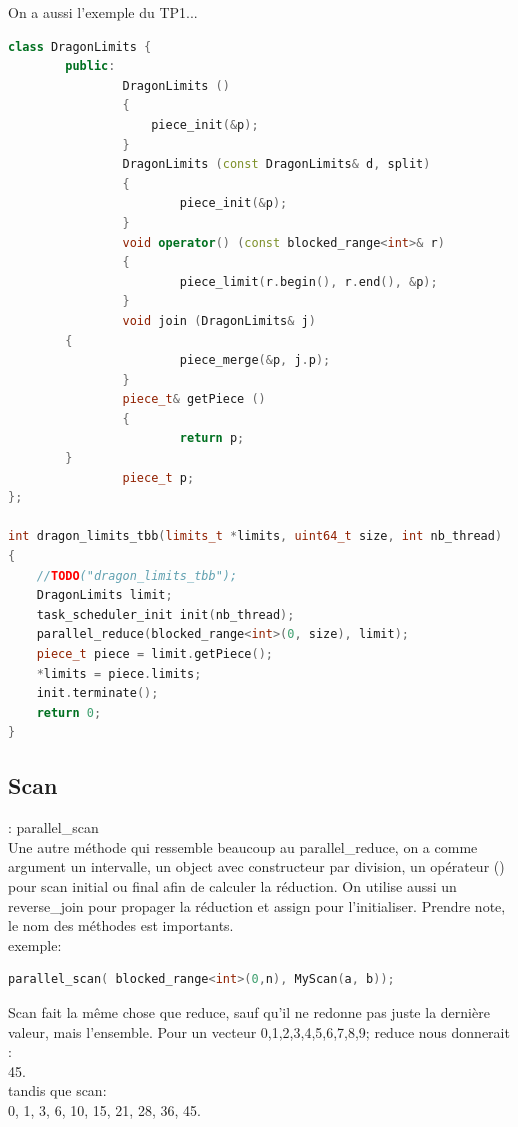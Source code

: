 \documentclass[oneside]{book}
\begin{document}
On a aussi l'exemple du TP1...

\begin{lstlisting}[language=c++]
class DragonLimits {
        public:
                DragonLimits ()
                {
                 	piece_init(&p);
                }
                DragonLimits (const DragonLimits& d, split)
                {
                        piece_init(&p);
                }
                void operator() (const blocked_range<int>& r)
                {
                        piece_limit(r.begin(), r.end(), &p);
                }
                void join (DragonLimits& j)
		{
                        piece_merge(&p, j.p);
                }
                piece_t& getPiece ()
                {
                        return p;
		}
                piece_t p;
};

int dragon_limits_tbb(limits_t *limits, uint64_t size, int nb_thread)
{
	//TODO("dragon_limits_tbb");
	DragonLimits limit;
	task_scheduler_init init(nb_thread);
	parallel_reduce(blocked_range<int>(0, size), limit);
	piece_t piece = limit.getPiece();
	*limits = piece.limits;
	init.terminate();
	return 0;
}
\end{lstlisting}

\subsection{Scan} : parallel\_scan\\

Une autre méthode qui ressemble beaucoup au parallel\_reduce, on a comme argument un intervalle, un object avec constructeur par division, un opérateur () pour scan initial ou final afin de calculer la réduction. On utilise aussi un reverse\_join pour propager la réduction et assign pour l'initialiser. Prendre note, le nom des méthodes est importants.\\

exemple: 
\begin{lstlisting}[language=c++]
parallel_scan( blocked_range<int>(0,n), MyScan(a, b));
\end{lstlisting}

Scan fait la même chose que reduce, sauf qu'il ne redonne pas juste la dernière valeur, mais l'ensemble. Pour un vecteur 0,1,2,3,4,5,6,7,8,9; reduce nous donnerait :\\
45.\\
tandis que scan:\\
0, 1, 3, 6, 10, 15, 21, 28, 36, 45. \\
\end{document}
